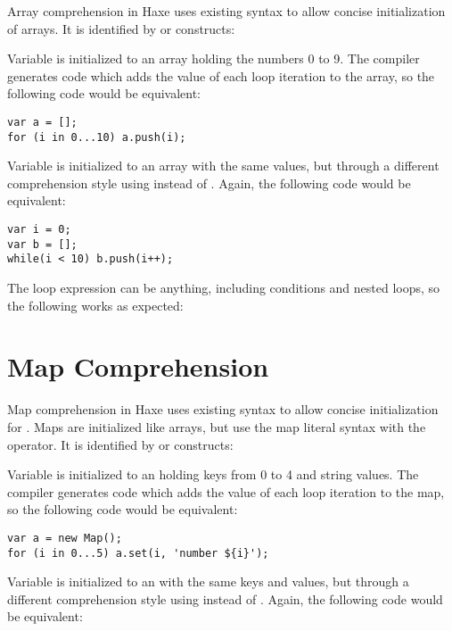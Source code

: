 Array comprehension in Haxe uses existing syntax to allow concise initialization of arrays. It is identified by  or  constructs:


Variable  is initialized to an array holding the numbers 0 to 9. The compiler generates code which adds the value of each loop iteration to the array, so the following code would be equivalent:

\begin{lstlisting}
var a = [];
for (i in 0...10) a.push(i);
\end{lstlisting}

Variable  is initialized to an array with the same values, but through a different comprehension style using  instead of . Again, the following code would be equivalent:

\begin{lstlisting}
var i = 0;
var b = [];
while(i < 10) b.push(i++);
\end{lstlisting}

The loop expression can be anything, including conditions and nested loops, so the following works as expected:


\section{Map Comprehension}
\label{lf-map-comprehension}

Map comprehension in Haxe uses existing syntax to allow concise initialization for . Maps are initialized like arrays, but use the map literal syntax with the \ic{=>} operator. It is identified by  or  constructs:


Variable  is initialized to an  holding keys from 0 to 4 and string values. The compiler generates code which adds the value of each loop iteration to the map, so the following code would be equivalent:

\begin{lstlisting}
var a = new Map();
for (i in 0...5) a.set(i, 'number ${i}');
\end{lstlisting}

Variable  is initialized to an  with the same keys and values, but through a different comprehension style using  instead of . Again, the following code would be equivalent:


